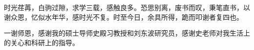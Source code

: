 

\begin{ack}
\par 时光荏苒，白驹过隙，求学三载，感触良多。恐思别离，废书而叹，秉笔直书，以谢众恩，忆似水年华，感时光不复。时至今日，余具所得，跪而叩谢者复四也。
\par 一谢师恩，感谢我的硕士导师史殿习教授和刘东波研究员，感谢史老师对我生活上的关心和科研上的指导。

\end{ack}
